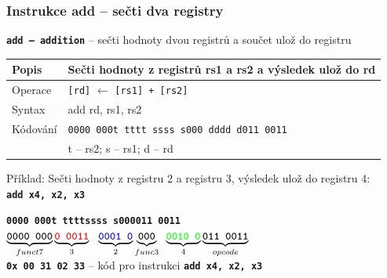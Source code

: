 \begin{frame}
\frametitle{Instrukce add -- sečti dva registry}

\textbf{\texttt{add -- addition}} -- sečti hodnoty dvou registrů a součet ulož do registru

\bigskip

\begin{tabular}{|l|l|}\hline
Popis & Sečti hodnoty z registrů rs1 a rs2 a výsledek ulož do rd \\ \hline
Operace & \texttt{[rd]} $\leftarrow$ \texttt{[rs1] + [rs2]} \\ \hline
Syntax & add rd, rs1, rs2 \\ \hline
Kódování & \texttt{0000 000t tttt ssss s000 dddd d011 0011} \\
 & t -- rs2; s -- rs1; d -- rd \\ \hline
\end{tabular}

\bigskip

Příklad: Sečti hodnoty z registru 2 a registru 3, výsledek ulož do registru 4:\\
\textbf{\texttt{add x4, x2, x3}}

\textbf{\texttt{0000 000\hspace{0.08cm}\color{red}t tttt}}\phantom{x}\hspace{0.13cm}\textbf{\texttt{\color{blue}ssss s}}\hspace{0.1cm}\textbf{\texttt{000\hspace{0.05cm}011 0011}}\\
$\underbrace{\textbf{\texttt{0000 000}}}_{funct7}
\underbrace{\textbf{\texttt{\color{red}0 0011}}}_{3}
\texttt{ }\underbrace{\textbf{\texttt{\color{blue}0001 0}}}_{2}
\underbrace{\textbf{\texttt{000}}}_{func3}\phantom{i}
\underbrace{\textbf{\texttt{\color{green}0010 0}}}_{4}
\underbrace{\textbf{\texttt{011 0011}}}_{opcode}$\\

\textbf{\texttt{0x 00 31 02 33}} -- kód pro instrukci \textbf{\texttt{add x4, x2, x3}}


\end{frame}

